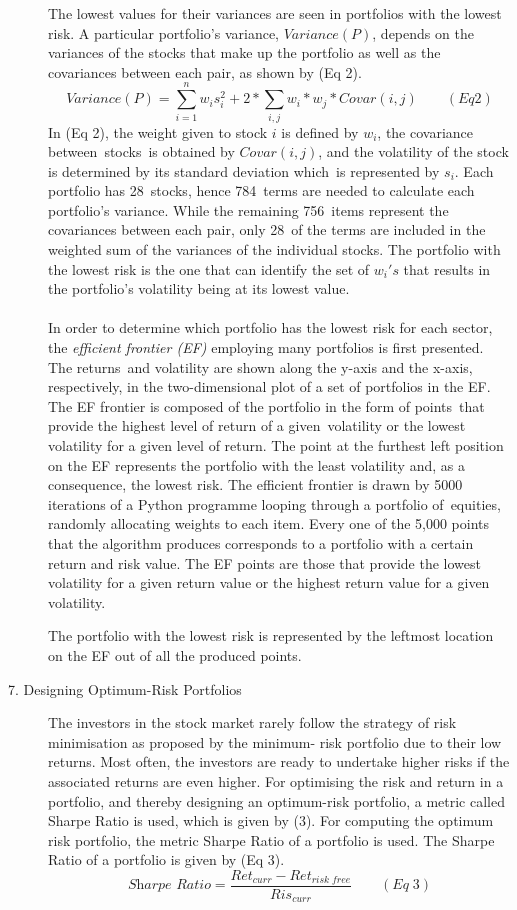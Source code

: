 \begin{description}
The lowest values for their variances are seen in portfolios with the lowest risk. A particular portfolio's variance, $Variance(P)$, depends on the variances of the stocks that make up the portfolio as well as the covariances between each pair, as shown by (Eq 2).
\[Variance(P) = \sum_{i = 1}^{n} w_{i}s_{i}^2 + 2*\sum_{i,j}w_{i}*w_{j}*Covar(i,j)\qquad(Eq 2)\]
In (Eq 2), the weight given to stock $i$ is defined by $w_{i}$, the covariance between stocks is obtained by $Covar(i,j)$, and the volatility of the stock is determined by its standard deviation which is represented by $s_{i}$. Each portfolio has 28 stocks, hence 784 terms are needed to calculate each portfolio's variance. While the remaining 756 items represent the covariances between each pair, only 28 of the terms are included in the weighted sum of the variances of the individual stocks. The portfolio with the lowest risk is the one that can identify the set of ${w_{i}}'s$ that results in the portfolio's volatility being at its lowest value.\\\\

In order to determine which portfolio has the lowest risk for each sector, the \textit{efficient frontier (EF)} employing many portfolios is first presented. The returns and volatility are shown along the y-axis and the x-axis, respectively, in the two-dimensional plot of a set of portfolios in the EF. The EF frontier is composed of the portfolio in the form of points that provide the highest level of return of a given volatility or the lowest volatility for a given level of return. The point at the furthest left position on the EF represents the portfolio with the least volatility and, as a consequence, the lowest risk. The efficient frontier is drawn by 5000 iterations of a Python programme looping through a portfolio of equities, randomly allocating weights to each item. Every one of the 5,000 points that the algorithm produces corresponds to a portfolio with a certain return and risk value. The EF points are those that provide the lowest volatility for a given return value or the highest return value for a given volatility.

The portfolio with the lowest risk is represented by the leftmost location on the EF out of all the produced points.
\item [7.  Designing Optimum-Risk Portfolios] The investors in the stock market rarely follow the
strategy of risk minimisation as proposed by the minimum-
risk portfolio due to their low returns. Most often, the
investors are ready to undertake higher risks if the associated
returns are even higher. For optimising the risk and return in
a portfolio, and thereby designing an optimum-risk portfolio,
a metric called Sharpe Ratio is used, which is given by (3).
For computing the optimum risk portfolio, the metric Sharpe
Ratio of a portfolio is used. The Sharpe Ratio of a portfolio is
given by (Eq 3).
\[\textit{Sharpe Ratio} = \frac{Ret_{curr} - Ret_{risk\;free}}{Ris_{curr}} \qquad (Eq\;3)\] 


\end{description}
